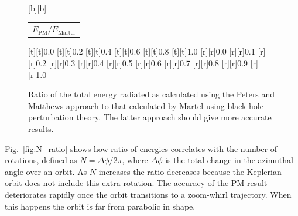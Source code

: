 \documentclass[aps,prd,amsfonts,amssymb,amsmath,reprint,showpacs,groupedaddress]{revtex4-1}
\newcommand{\Figref}[1]{Fig.\ \ref{fig:#1}}
\begin{document}
\begin{figure}
{\begin{psfrags}
[b][b]{\color[rgb]{0,0,0}\setlength{\tabcolsep}{0pt}\begin{tabular}{c}{\Large$E_\text{PM}/E_\text{Martel}$}\end{tabular}}%
%
[t][t]{0.0}%
[t][t]{0.2}%
[t][t]{0.4}%
[t][t]{0.6}%
[t][t]{0.8}%
[t][t]{1.0}%
%
[r][r]{0.0}%
[r][r]{0.1}%
[r][r]{0.2}%
[r][r]{0.3}%
[r][r]{0.4}%
[r][r]{0.5}%
[r][r]{0.6}%
[r][r]{0.7}%
[r][r]{0.8}%
[r][r]{0.9}%
[r][r]{1.0}%
%
%
\end{psfrags}%
}
\caption{Ratio of the total energy radiated as calculated using the Peters and Matthews\cite{Peters1963} approach to that calculated by Martel\cite{Martel2004a} using black hole perturbation theory. The latter approach should give more accurate results.}
\end{figure}
\Figref{N_ratio} shows how ratio of energies correlates with the number of rotations, defined as $N = {\Delta \phi}/{2\pi}$, where $\Delta \phi$ is the total change in the azimuthal angle over an orbit. As $N$ increases the ratio decreases because the Keplerian orbit does not include this extra rotation. The accuracy of the PM result deteriorates rapidly once the orbit transitions to a zoom-whirl trajectory. When this happens the orbit is far from parabolic in shape.
\end{document}
